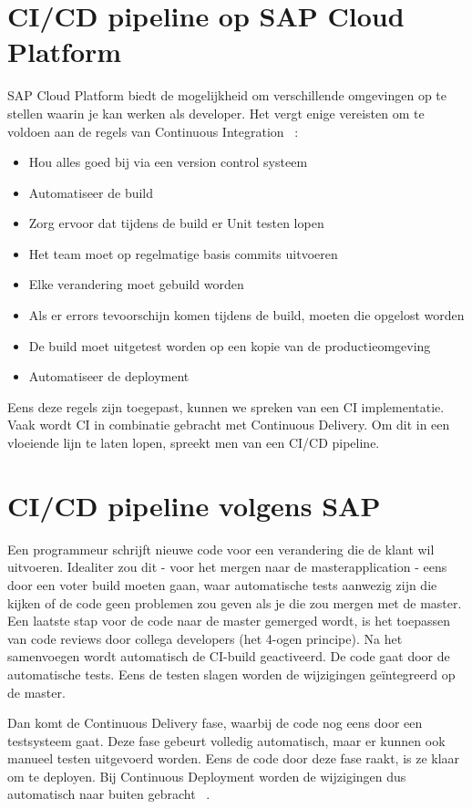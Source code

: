 \section{CI/CD pipeline op SAP Cloud Platform}
\label{sec:ci-cd-op-sap-cloud-platform}
SAP Cloud Platform biedt de mogelijkheid om verschillende omgevingen op te stellen waarin je kan werken als developer. Het vergt enige vereisten om te voldoen aan de regels van Continuous Integration ~\autocite{Kramer2018}:
\begin{itemize}
    \item Hou alles goed bij via een version control systeem
    \item Automatiseer de build
    \item Zorg ervoor dat tijdens de build er Unit testen lopen
    \item Het team moet op regelmatige basis commits uitvoeren
    \item Elke verandering moet gebuild worden
    \item Als er errors tevoorschijn komen tijdens de build, moeten die opgelost worden
    \item De build moet uitgetest worden op een kopie van de productieomgeving
    \item Automatiseer de deployment
\end{itemize}
Eens deze regels zijn toegepast, kunnen we spreken van een CI implementatie.
Vaak wordt CI in combinatie gebracht met Continuous Delivery. Om dit in een vloeiende lijn te laten lopen, spreekt men van een CI/CD pipeline.

\section{CI/CD pipeline volgens SAP}
\label{sec:ci-cd-pipeling-volgens-sap}
Een programmeur schrijft nieuwe code voor een verandering die de klant wil uitvoeren. Idealiter zou dit - voor het mergen naar de masterapplication - eens door een voter build moeten gaan, waar automatische tests aanwezig zijn die kijken of de code geen problemen zou geven als je die zou mergen met de master. Een laatste stap voor de code naar de master gemerged wordt, is het toepassen van code reviews door collega developers (het 4-ogen principe).
Na het samenvoegen wordt automatisch de CI-build geactiveerd. De code gaat door de automatische tests. Eens de testen slagen worden de wijzigingen geïntegreerd op de master. 

Dan komt de Continuous Delivery fase, waarbij de code nog eens door een testsysteem gaat. Deze fase gebeurt volledig automatisch, maar er kunnen ook manueel testen uitgevoerd worden. Eens de code door deze fase raakt, is ze klaar om te deployen. 
Bij Continuous Deployment worden de wijzigingen dus automatisch naar buiten gebracht ~\autocite{Kramer2018}.

